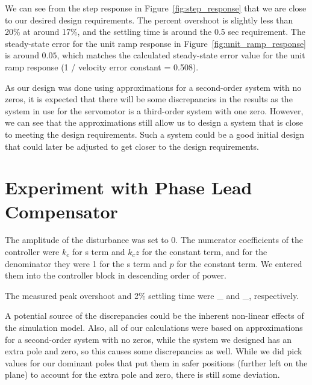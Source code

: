 \documentclass[12pt]{article}
\begin{document}
We can see from the step response in Figure~\ref{fig:step_response} that we are close to our desired design requirements. The percent overshoot is slightly less than 20\% at around 17\%, and the settling time is around the 0.5 sec requirement. The steady-state error for the unit ramp response in Figure~\ref{fig:unit_ramp_response} is around $0.05$, which matches the calculated steady-state error value for the unit ramp response (1 / velocity error constant = 0.508). 

As our design was done using approximations for a second-order system with no zeros, it is expected that there will be some discrepancies in the results as the system in use for the servomotor is a third-order system with one zero. However, we can see that the approximations still allow us to design a system that is close to meeting the design requirements. Such a system could be a good initial design that could later be adjusted to get closer to the design requirements.

\section{Experiment with Phase Lead Compensator}
The amplitude of the disturbance was set to 0. The numerator coefficients of the controller were $k_c$ for s term and $k_cz$ for the constant term, and for the denominator they were 1 for the s term and $p$ for the constant term. We entered them into the controller block in descending order of power.

The measured peak overshoot and 2\% settling time were \_ and \_, respectively.

A potential source of the discrepancies could be the inherent non-linear effects of the simulation model. Also, all of our calculations were based on approximations for a second-order system with no zeros, while the system we designed has an extra pole and zero, so this causes some discrepancies as well. While we did pick values for our dominant poles that put them in safer positions (further left on the plane) to account for the extra pole and zero, there is still some deviation.
\end{document}
